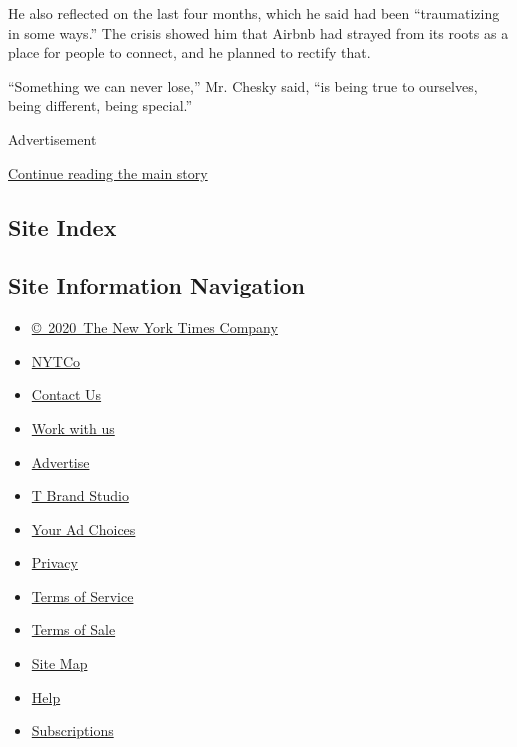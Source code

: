 He also reflected on the last four months, which he said had been
``traumatizing in some ways.'' The crisis showed him that Airbnb had
strayed from its roots as a place for people to connect, and he planned
to rectify that.

``Something we can never lose,'' Mr. Chesky said, ``is being true to
ourselves, being different, being special.''

Advertisement

\protect\hyperlink{after-bottom}{Continue reading the main story}

\hypertarget{site-index}{%
\subsection{Site Index}\label{site-index}}

\hypertarget{site-information-navigation}{%
\subsection{Site Information
Navigation}\label{site-information-navigation}}

\begin{itemize}
\tightlist
\item
  \href{https://help.nytimes.com/hc/en-us/articles/115014792127-Copyright-notice}{©~2020~The
  New York Times Company}
\end{itemize}

\begin{itemize}
\tightlist
\item
  \href{https://www.nytco.com/}{NYTCo}
\item
  \href{https://help.nytimes.com/hc/en-us/articles/115015385887-Contact-Us}{Contact
  Us}
\item
  \href{https://www.nytco.com/careers/}{Work with us}
\item
  \href{https://nytmediakit.com/}{Advertise}
\item
  \href{http://www.tbrandstudio.com/}{T Brand Studio}
\item
  \href{https://www.nytimes.com/privacy/cookie-policy\#how-do-i-manage-trackers}{Your
  Ad Choices}
\item
  \href{https://www.nytimes.com/privacy}{Privacy}
\item
  \href{https://help.nytimes.com/hc/en-us/articles/115014893428-Terms-of-service}{Terms
  of Service}
\item
  \href{https://help.nytimes.com/hc/en-us/articles/115014893968-Terms-of-sale}{Terms
  of Sale}
\item
  \href{https://spiderbites.nytimes.com}{Site Map}
\item
  \href{https://help.nytimes.com/hc/en-us}{Help}
\item
  \href{https://www.nytimes.com/subscription?campaignId=37WXW}{Subscriptions}
\end{itemize}
